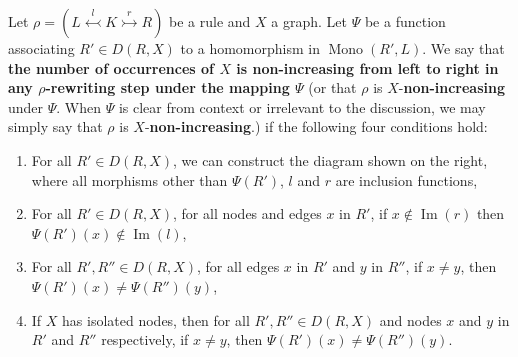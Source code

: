 \begin{definition}
    \label{def:creates_more_x_on_the_left}
    Let \(\rho = (L \overset{l}{\leftarrowtail} K \overset{r}{\rightarrowtail} R)\) be a rule and \(X\) a graph. 
    Let \( \Psi \) be a function associating $R' \in D(R,X)$ to a homomorphism in $\operatorname{Mono}(R',L)$.
    We say that \textbf{the number of occurrences of $X$ is non-increasing from left to right in any $\rho$-rewriting step under the mapping \(\Psi\)}
    (or that $\rho$ is $X$-\textbf{non-increasing} under $\Psi$. When $\Psi$ is clear from context or irrelevant to the discussion, we may simply say that $\rho$ is $X$-\textbf{non-increasing}.)
    if the following four conditions hold:
    \newline
    \vspace{1mm}
    \noindent
    \begin{minipage}{0.64\textwidth} 
    \begin{enumerate}
        \item For all $R' \in D(R,X)$, we can construct the diagram shown on the right, where all morphisms other than $\Psi(R')$, $l$ and $r$ are inclusion functions,
        \item \label{def:non_increasing:non_clapse} For all $R' \in D(R,X)$, for all nodes and edges $x$ in $R'$, if $ x \notin \operatorname{Im}(r)$ then 
        $\Psi(R')(x) \notin \operatorname{Im}(l)$,
        \item \label{def:non_increasing_rule_img_edges_distinct} For all $R',R'' \in D(R,X)$, for all edges $x$ in $R'$ and $y$ in $R''$, if $x \neq y$, then $\Psi(R')(x) \neq \Psi(R'')(y)$,
        \item If $X$ has isolated nodes, then for all $R',R'' \in D(R,X)$ and nodes $x$ and $y$ in $R'$ and $R''$ respectively, if $x \neq y$, then $\Psi(R')(x) \neq \Psi(R'')(y)$.
    \end{enumerate} 
    \end{minipage}

\end{definition}
